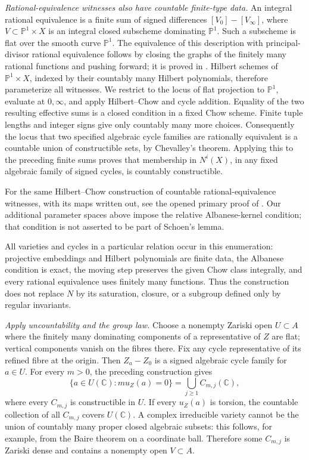 \emph{Rational-equivalence witnesses also have countable finite-type data.}
An integral rational equivalence is a finite sum of signed
differences $[V_0]-[V_\infty]$, where
$V\subset\mathbb P^1\times X$ is an integral closed subscheme
dominating $\mathbb P^1$. Such a subscheme is flat over the
smooth curve $\mathbb P^1$. The equivalence of this description
with principal-divisor rational equivalence follows by closing
the graphs of the finitely many rational functions and pushing
forward; it is proved in
\citet[Lemma 43.9.1, Tag 0AZI]{cyStacksRationalEquivalence}.
Hilbert schemes of $\mathbb P^1\times X$, indexed by their
countably many Hilbert polynomials, therefore parameterize
all witnesses. We restrict to the locus of flat projection
to $\mathbb P^1$, evaluate at $0,\infty$, and apply
Hilbert--Chow and cycle addition. Equality of the two resulting
effective sums is a closed condition in a fixed Chow scheme.
Finite tuple lengths and integer signs give only countably
many more choices. Consequently the locus that two
specified algebraic cycle families are rationally equivalent
is a countable union of constructible sets, by Chevalley's
theorem. Applying this to the preceding finite sums proves
that membership in $N^i(X)$, in any fixed algebraic family
of signed cycles, is countably constructible.

For the same Hilbert--Chow construction of countable
rational-equivalence witnesses, with its maps written out,
see the opened primary proof of
\citet[Lemma 4.4, pp.~311--313]{cySchoen1993}.
Our additional parameter spaces above impose the relative
Albanese-kernel condition; that condition is not asserted
to be part of Schoen's lemma.

All varieties and cycles in a particular relation occur in
this enumeration: projective embeddings and Hilbert polynomials
are finite data, the Albanese condition is exact, the moving
step preserves the given Chow class integrally, and every
rational equivalence uses finitely many functions. Thus the
construction does not replace $N$ by its saturation, closure,
or a subgroup defined only by regular invariants.

\emph{Apply uncountability and the group law.}
Choose a nonempty Zariski open $U\subset A$ where the finitely
many dominating components of a representative of $Z$ are
flat; vertical components vanish on the fibres there. Fix
any cycle representative of its refined fibre at the origin.
Then $Z_a-Z_0$ is a signed algebraic cycle family for $a\in U$.
For every $m>0$, the preceding construction gives
\[
 \{a\in U(\mathbb C):m u_Z(a)=0\}
                 =\bigcup_{j\ge1}C_{m,j}(\mathbb C),
\]
where every $C_{m,j}$ is constructible in $U$.
If every $u_Z(a)$ is torsion, the countable collection of all
$C_{m,j}$ covers $U(\mathbb C)$. A complex irreducible variety
cannot be the union of countably many proper closed algebraic
subsets: this follows, for example, from the Baire theorem on
a coordinate ball. Therefore some $C_{m,j}$ is Zariski dense
and contains a nonempty open $V\subset A$.

